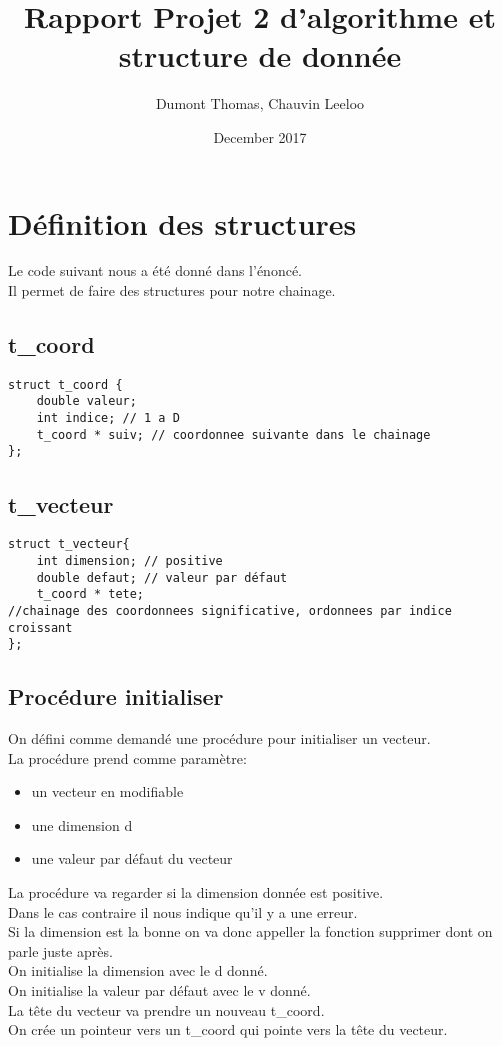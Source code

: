 \documentclass[a4paper,11pt,final]{article}
\title{Rapport Projet 2 d'algorithme et structure de donnée}
\author{Dumont Thomas, Chauvin Leeloo}
\date{December 2017}
\begin{document}
\maketitle

\section{Définition des structures}
Le code suivant nous a été donné dans l'énoncé.\\
Il permet de faire des structures pour notre chainage.
\subsection{t\_coord}
\begin{verbatim}
struct t_coord {
    double valeur;
    int indice; // 1 a D
    t_coord * suiv; // coordonnee suivante dans le chainage
};
\end{verbatim}
\subsection{t\_vecteur}
\begin{verbatim}
struct t_vecteur{
    int dimension; // positive
    double defaut; // valeur par défaut
    t_coord * tete; 
//chainage des coordonnees significative, ordonnees par indice croissant
};
\end{verbatim}
\subsection{Procédure initialiser}
On défini comme demandé une procédure pour initialiser un vecteur.\\
La procédure prend comme paramètre:
\begin{itemize}
    \item un vecteur en modifiable
    \item une dimension d
    \item une valeur par défaut du vecteur
\end{itemize} 
La procédure va regarder si la dimension donnée est positive.\\
Dans le cas contraire il nous indique qu'il y a une erreur.\\
Si la dimension est la bonne on va donc appeller la fonction supprimer dont on parle juste après.\\
On initialise la dimension avec le d donné.\\
On initialise la valeur par défaut avec le v donné.\\
La tête du vecteur va prendre un nouveau t\_coord.\\
On crée un pointeur vers un t\_coord qui pointe vers la tête du vecteur.\\
\pagebreak
\end{document}
